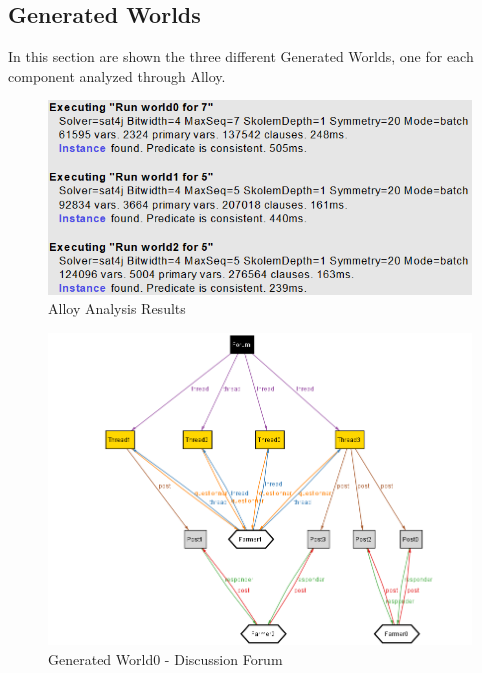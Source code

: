 \subsection{Generated Worlds}

In this section are shown the three different Generated Worlds, one for each component analyzed through Alloy.\\



\begin{figure}[H]
  \includegraphics[width=\textwidth,height=\textheight,keepaspectratio]{./Images/Alloy/predicatesExecution.png}
  \caption{Alloy Analysis Results}
\end{figure}

\begin{center}
\begin{figure}[H]
\centering
  \includegraphics[angle = 90,scale= 0.55]{./Images/Alloy/DiscussionForum.png}
    \caption{Generated World0 - Discussion Forum}
    \label{fig:LandscapeFigure}
\end{figure}
\end{center}

